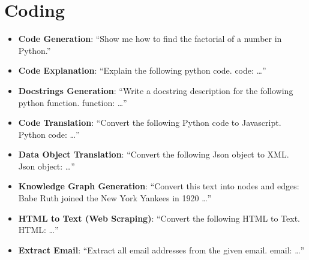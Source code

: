 \section{Coding}
\begin{itemize}
\itemsep-0.25em %
\item \textbf{Code Generation}: ``Show me how to find the factorial of a number in Python.''
\item \textbf{Code Explanation}: ``Explain the following python code. code: \ldots''
\item \textbf{Docstrings Generation}: ``Write a docstring description for the following python function. function: \ldots''
\item \textbf{Code Translation}: ``Convert the following Python code to Javascript. Python code: \ldots''
\item \textbf{Data Object Translation}: ``Convert the following Json object to XML. Json object: \ldots''
\item \textbf{Knowledge Graph Generation}: ``Convert this text into nodes and edges: Babe Ruth joined the New York Yankees in 1920 \ldots''
\item \textbf{HTML to Text (Web Scraping)}: ``Convert the following HTML to Text. HTML: \ldots''
\item \textbf{Extract Email}: ``Extract all email addresses from the given email. email: \ldots''

\end{itemize}

